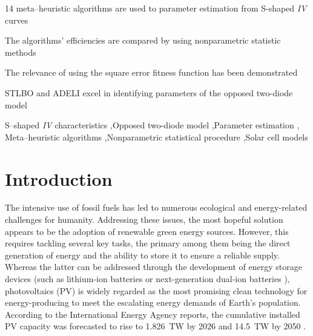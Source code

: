 \documentclass[a4paper,fleqn]{cas-sc}
\begin{document}
\begin{highlights}
\item 14 meta--heuristic algorithms are used to parameter estimation from S-shaped \emph{IV} curves
\item The algorithms' efficiencies are compared by using nonparametric statistic methods
\item The relevance of using the square error fitness function has been demonstrated
\item STLBO and ADELI excel in identifying parameters of the opposed two-diode model
\end{highlights}


\begin{keywords}
S--shaped \emph{IV} characteristics \sep Opposed two-diode model \sep Parameter estimation \sep
Meta--heuristic algorithms \sep Nonparametric statistical procedure \sep Solar cell models
\end{keywords}

\maketitle

\section{Introduction}\label{Int}




The intensive use of fossil fuels has led to numerous ecological and energy-related challenges for humanity.
Addressing these issues, the most hopeful solution appears to be the adoption of renewable green energy sources.
However, this requires tackling several key tasks,
the primary among them being the direct generation of energy and the ability to store it to ensure a reliable supply.
Whereas the latter can be addressed through the development of energy storage devices
(such as lithium-ion batteries or next-generation dual-ion batteries  \cite{Zhang2024,Wang2018,Zhang2016}),
photovoltaics (PV) is widely regarded as the most promising clean technology for energy-producing
to meet the escalating energy demands of Earth's population.
According to the International Energy Agency reports,
the cumulative installed PV capacity was forecasted to rise to 1.826~TW by 2026 and 14.5~TW by 2050 \cite{Wang2022}.
\end{document}
